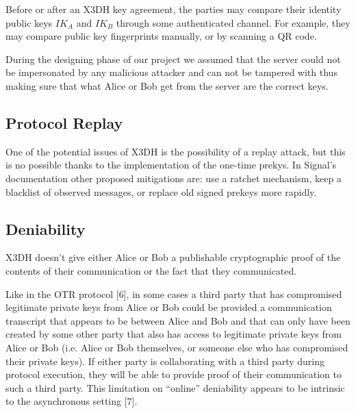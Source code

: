 Before or after an X3DH key agreement, the parties may compare their identity public keys $IK_A$ and $IK_B$ through some authenticated channel. For example, they may compare public key fingerprints manually, or by scanning a QR code.

During the designing phase of our project we assumed that the server could not be impersonated by any malicious attacker and can not be tampered with thus making sure that what Alice or Bob get from the server are the correct keys.

\subsection{Protocol Replay}
\label{subsec:ProtocolReplay}

One of the potential issues of X3DH is the possibility of a replay attack, but this is no possible thanks to the implementation of the one-time prekys. In Signal's documentation other proposed mitigations are: use a ratchet mechanism, keep a blacklist of observed messages, or replace old signed prekeys more rapidly.

\subsection{Deniability}
\label{subsec:Deniability}

X3DH doesn’t give either Alice or Bob a publishable cryptographic proof of the contents of their communication or the fact that they communicated.

Like in the OTR protocol [6], in some cases a third party that has compromised
legitimate private keys from Alice or Bob could be provided a communication
transcript that appears to be between Alice and Bob and that can only have
been created by some other party that also has access to legitimate private
keys from Alice or Bob (i.e. Alice or Bob themselves, or someone else who has
compromised their private keys).
If either party is collaborating with a third party during protocol execution, they
will be able to provide proof of their communication to such a third party. This
limitation on “online” deniability appears to be intrinsic to the asynchronous
setting [7].
